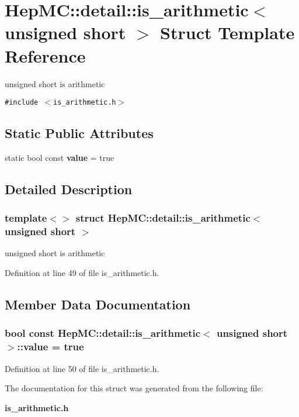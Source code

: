 \section{Hep\-MC::detail::is\_\-arithmetic$<$ unsigned short $>$ Struct Template Reference}
\label{structHepMC_1_1detail_1_1is__arithmetic_3_01unsigned_01short_01_4}
unsigned short is arithmetic  


{\tt \#include $<$is\_\-arithmetic.h$>$}

\subsection*{Static Public Attributes}
\begin{CompactItemize}
\item 
static bool const {\bf value} = true
\end{CompactItemize}


\subsection{Detailed Description}
\subsubsection*{template$<$$>$ struct Hep\-MC::detail::is\_\-arithmetic$<$ unsigned short $>$}

unsigned short is arithmetic 



Definition at line 49 of file is\_\-arithmetic.h.

\subsection{Member Data Documentation}
\subsubsection{\setlength{\rightskip}{0pt plus 5cm}bool const {\bf Hep\-MC::detail::is\_\-arithmetic}$<$ unsigned short $>$::{\bf value} = true\hspace{0.3cm}{\tt  [static]}}\label{structHepMC_1_1detail_1_1is__arithmetic_3_01unsigned_01short_01_4_04eeb23cc6ce29893eabd8be90ee69d3}




Definition at line 50 of file is\_\-arithmetic.h.

The documentation for this struct was generated from the following file:\begin{CompactItemize}
\item 
{\bf is\_\-arithmetic.h}\end{CompactItemize}
